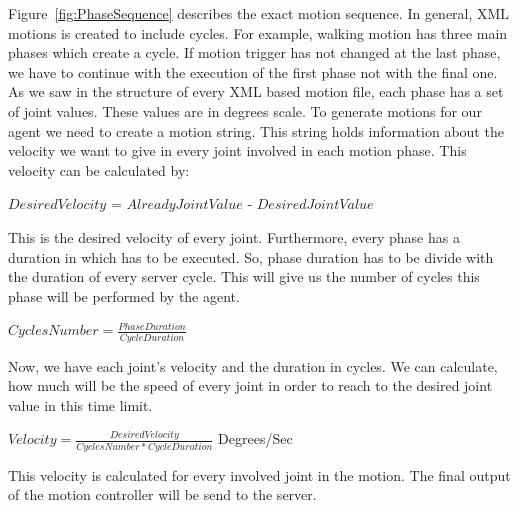 Figure~\ref{fig:PhaseSequence} describes the exact motion sequence. In general, XML motions is created to include cycles. For example, walking motion has three main phases which create a cycle. If motion trigger has not changed at the last phase, we have to continue with the execution of the first phase not with the final one. As we saw in the structure of every XML based motion file, each phase has a set of joint values. These values are in degrees scale. To generate motions for our agent we need to create a motion string. This string holds information about the velocity we want to give in every joint involved in each motion phase. This velocity can be calculated by:
\begin{center}
$Desired Velocity$ = $Already Joint Value$ - $Desired Joint Value$
\end{center}
This is the desired velocity of every joint. Furthermore, every phase has a duration in which has to be executed. So, phase duration has to be divide with the duration of every server cycle. This will give us the number of cycles this phase will be performed by the agent.
\begin{center}
$Cycles Number = \frac {Phase Duration} {Cycle Duration}$
\end{center}
Now, we have each joint's velocity and the duration in cycles. We can calculate, how much will be the speed of every joint in order to reach to the desired joint value in this time limit.
\begin{center}
$Velocity = \frac {Desired Velocity} {Cycles Number \ast CycleDuration} $ Degrees/Sec
\end{center}
This velocity is calculated for every involved joint in the motion. The final output of the motion controller will be send to the server.



